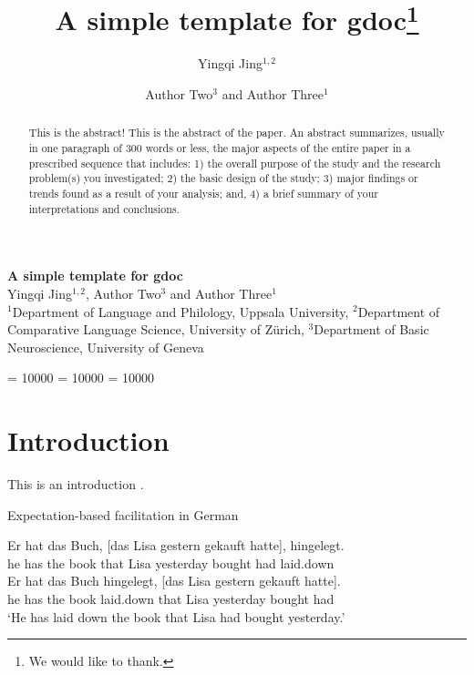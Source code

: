 \documentclass[10pt,a4paper,]{article}
\title{A simple template for gdoc\thanks{We would like to thank.}}
\author{Yingqi Jing\(^{1,2}\) \and Author Two\(^3\) and Author
Three\(^1\)}
\date{}
\let\eachwordone=\itshape
\let\eachwordtwo=\small
\def\gltoffset{0.5ex}
\begin{document}
\thispagestyle{empty}

\begin{center}
	{\doublespacing
	{\Large\sffamily\bfseries{A simple template for gdoc}}\\[6pt]
	
	{\normalsize Yingqi Jing\(^{1,2}\), Author Two\(^3\) and Author
Three\(^1\)}
	\\ %
		}
	{\vspace{\baselineskip}\small \(^1\)Department of Language and
Philology, Uppsala University, \(^2\)Department of Comparative Language
Science, University of Zürich, \(^3\)Department of Basic Neuroscience,
University of Geneva}
	


\end{center}
\vspace{6pt}


\vspace{\baselineskip}
\begin{abstract}
	This is the abstract! This is the abstract of the paper. An abstract
summarizes, usually in one paragraph of 300 words or less, the major
aspects of the entire paper in a prescribed sequence that includes: 1)
the overall purpose of the study and the research problem(s) you
investigated; 2) the basic design of the study; 3) major findings or
trends found as a result of your analysis; and, 4) a brief summary of
your interpretations and conclusions.
\end{abstract}\vspace{2\baselineskip}

\setlength{\parskip}{4pt}
\renewcommand{\labelitemi}{-}

\clubpenalty = 10000 \widowpenalty = 10000 \displaywidowpenalty = 10000

\let\eachwordone=\itshape
\let\eachwordtwo=\small
\def\gltoffset{0.5ex}

\section{Introduction}\label{introduction}

This is an introduction \autocite{Kemmerer2012}.

\begin{exe} \ex Expectation-based facilitation in German \label{ex-german}
\begin{xlist}
\ex \gll Er hat das Buch, [das Lisa gestern gekauft hatte], hingelegt.\\
         he has the book that Lisa yesterday bought had laid.down\\
\ex  \gll Er hat das Buch hingelegt, [das Lisa gestern gekauft hatte].\\
        he has the book laid.down that Lisa yesterday bought had\\
       \glt ‘He has laid down the book that Lisa had bought yesterday.’ 
\end{xlist}
\end{exe}
\end{document}
